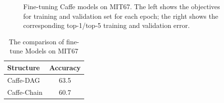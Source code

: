 \documentclass[10pt,twocolumn,letterpaper]{article}
\begin{document}
\begin{figure}
\centering

\caption{Fine-tuning Caffe models on MIT67. The left shows the objectives for training and validation set for each epoch; the right shows the corresponding top-1/top-5 training and validation error.}
\label{fig:ft_curve}
\end{figure}




\begin{table}[htbp]
\begin{center}
\begin{tabular}{|l|c|}
\hline
Structure & Accuracy \\
\hline
Caffe-DAG & 63.5   \\
Caffe-Chain & 60.7   \\

\hline
\end{tabular}
\end{center}
\caption{The comparison of fine-tune Models on MIT67}
\label{table:ft_models}
\end{table}
\end{document}
